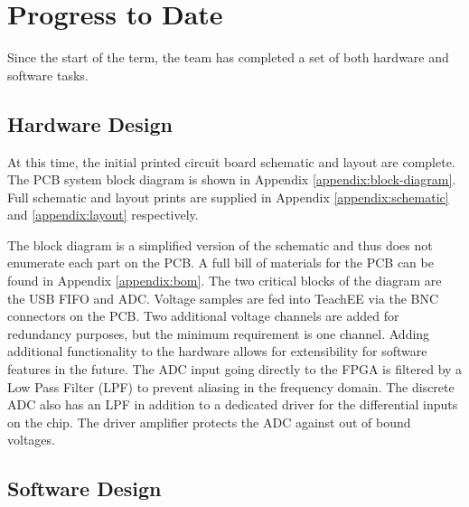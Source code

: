 \documentclass[letterpaper,12pt]{article}
\begin{document}
\section{Progress to Date} %
Since the start of the term, the team has completed a set of both hardware and
software tasks.

\subsection{Hardware Design}
At this time, the initial printed circuit board schematic and
layout are complete. The PCB system block diagram is shown in Appendix
\ref{appendix:block-diagram}. Full schematic and layout prints are supplied
in Appendix \ref{appendix:schematic} and \ref{appendix:layout} respectively.

The block diagram is a simplified version of the schematic and thus does
not enumerate each part on the PCB. A full bill of materials for the PCB can be
found in Appendix \ref{appendix:bom}. The two critical blocks of the diagram are
the USB FIFO and ADC. Voltage samples are fed into TeachEE via the BNC connectors
on the PCB. Two additional voltage channels are added for redundancy purposes,
but the minimum requirement is one channel. Adding additional functionality to
the hardware allows for extensibility for software features in the future. The
ADC input going directly to the FPGA is filtered by a Low Pass Filter (LPF) to
prevent aliasing in the frequency domain. The discrete ADC also has an LPF in
addition to a dedicated driver for the differential inputs on the chip. The
driver amplifier protects the ADC against out of bound voltages.

\subsection{Software Design}
\end{document}
